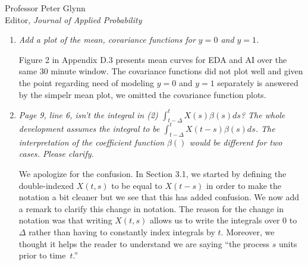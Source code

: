 \documentclass[11pt]{letter} %
\begin{document}
\begin{letter}{Professor
	Peter Glynn\\
	Editor, {\em Journal of Applied Probability}}
\begin{enumerate}
\vspace{5mm}
The event times~$T_i$ depend heavily on the event intensity function~$h_i (t;\theta)$ and will not be guaranteed to be uniformly spread across points in $[0,\tau]$.  The subsampling times~$D_i$ depend on the subsampling intensity function~$\pi_i(t)$; under the assumption that $\pi_i (t) = \lambda$, we can view this as first drawing the number of non-event times from a Poisson distribution, i.e., $| D_i | \sim Poisson(\lambda)$, and then independently selecting $|D_i|$ non-event times uniformly at random over the observation window~$[0, \tau_i]$.  Given the potential difference between the distributions, we choose to model the mean and covariance functions separately to ensure good approximation when applying the spectral decomposition of the estimated covariance function.  To illustrate this, Figure 2 in Appendix D.3 presents mean curves for EDA and AI over the same 30 minute window.  These figures demonstrate quite distinct behavior. Another reason for treating these two distinctly is that the missing data imputation from Petrovich et al. (2018) requires distinct covariance functions.  given the potential difference between the distributions, we choose to model the mean and covariance functions separately to ensure good approximation when applying the spectral decomposition of the estimated covariance function.  To illustrate this, Figure 2 in Appendix D.3 presents mean curves for EDA and AI over the same 30 minute window.
\vspace{5mm}

\item {\it Add a plot of the mean, covariance functions for $y=0$ and $y=1$.}

\vspace{5mm}
Figure 2 in Appendix D.3 presents mean curves for EDA and AI over the same 30 minute window.  The covariance functions did not plot well and given the point regarding need of modeling $y=0$ and $y=1$ separately is answered by the simpelr mean plot, we omitted the covariance function plots.
\vspace{5mm}

\item {\it Page 9, line 6, isn’t the integral in (2) $\int_{t-\Delta}^t X(s) \beta(s)ds$? The whole development assumes the integral to be $\int_{t-\Delta}^t X(t-s) \beta(s)ds$. The interpretation of the coefficient function $\beta()$ would be different for two cases. Please clarify.}

\vspace{5mm}
We apologize for the confusion.  In Section 3.1, we started by defining the double-indexed $X(t,s)$ to be equal to $X(t-s)$ in order to make the notation a bit cleaner but we see that this has added confusion.  We now add a remark to clarify this change in notation.  The reason for the change in notation was that writing $X(t,s)$ allows us to write the integrals over $0$ to $\Delta$ rather than having to constantly index integrals by $t$.  Moreover, we thought it helps the reader to understand we are saying ``the process $s$ units prior to time~$t$.''
\vspace{5mm}


\end{enumerate}
\end{letter}
\end{document}
